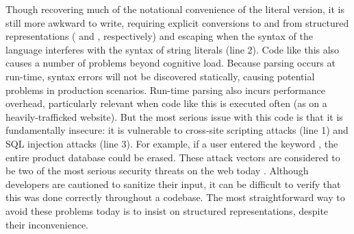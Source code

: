 Though recovering much of the notational convenience of the literal version, it is still more awkward to write, requiring explicit conversions to and from structured representations ( and , respectively) and escaping when the syntax of the language interferes with the syntax of string literals (line 2). Code like this also causes a number of problems beyond cognitive load. Because parsing occurs at run-time, syntax errors will not be discovered statically, causing potential problems in production scenarios. Run-time parsing also incurs performance overhead, particularly relevant when code like this is executed often (as on a heavily-trafficked website). But the most serious issue with this code is that it is fundamentally insecure: it is vulnerable to cross-site scripting attacks (line 1) and SQL injection attacks (line 3). For example, if a user entered the keyword , the entire product database could be erased. These attack vectors are considered to be two of the most serious security threats on the web today \cite{owasp2013}. Although developers are cautioned to sanitize their input, it can be difficult to verify that this was done correctly throughout a codebase. The most straightforward way to avoid these problems today is to insist on structured representations, despite their inconvenience.


